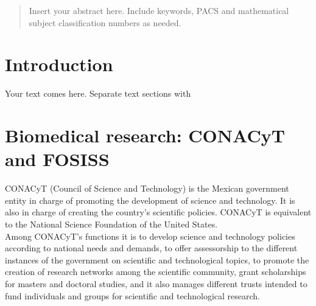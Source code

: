 
\date{Received: date / Accepted: date}


\maketitle

\begin{abstract}
Insert your abstract here. Include keywords, PACS and mathematical
subject classification numbers as needed.
\end{abstract}

\section{Introduction}
\label{intro}

Your text comes here. Separate text sections with



\section{Biomedical research: CONACyT and FOSISS}
\label{sec:1}
CONACyT (Council of Science and Technology) is the Mexican government entity in charge of promoting the development of science and
technology. It is also in charge of creating the country's scientific policies. CONACyT is equivalent to the National Science Foundation of the United States.\\

Among CONACyT's functions it is to develop science and technology
policies according to national needs and demands, to offer
assessorship to the different instances of the government on
scientific and technological topics, to promote the creation of
research networks among the scientific community, grant scholarships
for masters and doctoral studies, and it also manages different trusts intended to fund individuals
and groups for scientific and technological research. \\

